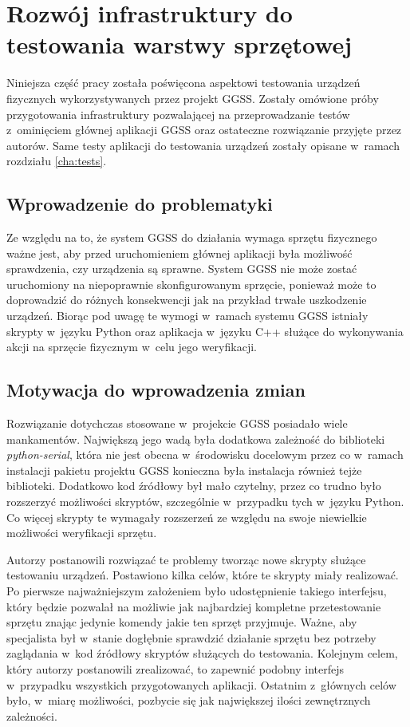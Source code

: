 \clearpage
\section{Rozwój infrastruktury do testowania warstwy sprzętowej}
\label{ch:hardware_testing}

Niniejsza część pracy została poświęcona aspektowi testowania urządzeń fizycznych wykorzystywanych przez projekt GGSS. Zostały omówione próby przygotowania infrastruktury pozwalającej na przeprowadzanie testów z~ominięciem głównej aplikacji GGSS oraz ostateczne rozwiązanie przyjęte przez autorów. Same testy aplikacji do testowania urządzeń zostały opisane w~ramach rozdziału \ref{cha:tests}.

\subsection{Wprowadzenie do problematyki}
Ze względu na to, że system GGSS do działania wymaga sprzętu fizycznego ważne jest, aby przed uruchomieniem głównej aplikacji była możliwość sprawdzenia, czy urządzenia są sprawne. System GGSS nie może zostać uruchomiony na niepoprawnie skonfigurowanym sprzęcie, ponieważ może to doprowadzić do różnych konsekwencji jak na przykład trwałe uszkodzenie urządzeń. Biorąc pod uwagę te wymogi w~ramach systemu GGSS istniały skrypty w~języku Python oraz aplikacja w~języku C++ służące do wykonywania akcji na sprzęcie fizycznym w~celu jego weryfikacji.

\subsection{Motywacja do wprowadzenia zmian}
Rozwiązanie dotychczas stosowane w~projekcie GGSS posiadało wiele mankamentów. Największą jego wadą była dodatkowa zależność do biblioteki \emph{python-serial}, która nie jest obecna w~środowisku docelowym przez co w~ramach instalacji pakietu projektu GGSS konieczna była instalacja również tejże biblioteki. Dodatkowo kod źródłowy był mało czytelny, przez co trudno było rozszerzyć możliwości skryptów, szczególnie w~przypadku tych w~języku Python. Co więcej skrypty te wymagały rozszerzeń ze względu na swoje niewielkie możliwości weryfikacji sprzętu.

Autorzy postanowili rozwiązać te problemy tworząc nowe skrypty służące testowaniu urządzeń. Postawiono kilka celów, które te skrypty miały realizować. Po pierwsze najważniejszym założeniem było udostępnienie takiego interfejsu, który będzie pozwalał na możliwie jak najbardziej kompletne przetestowanie sprzętu znając jedynie komendy jakie ten sprzęt przyjmuje. Ważne, aby specjalista był w~stanie dogłębnie sprawdzić działanie sprzętu bez potrzeby zaglądania w~kod źródłowy skryptów służących do testowania. Kolejnym celem, który autorzy postanowili zrealizować, to zapewnić podobny interfejs w~przypadku wszystkich przygotowanych aplikacji. Ostatnim z~głównych celów było, w~miarę możliwości, pozbycie się jak największej ilości zewnętrznych zależności.


